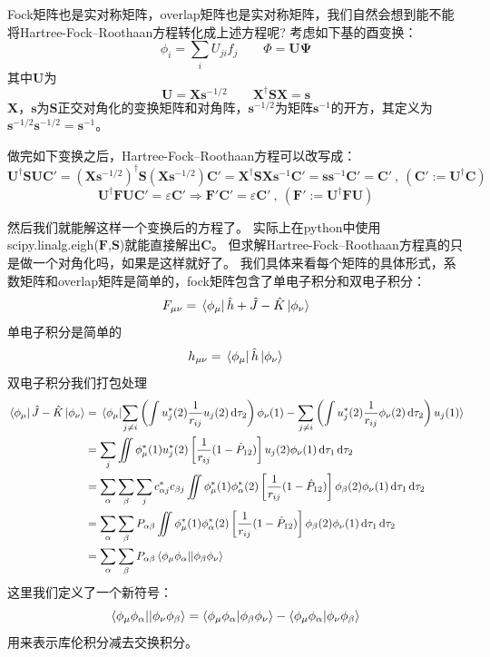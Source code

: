 Fock矩阵也是实对称矩阵，overlap矩阵也是实对称矩阵，我们自然会想到能不能将Hartree-Fock–Roothaan方程转化成上述方程呢?
考虑如下基的酉变换：
\[\phi_i = \sum_{i}U_{ji}f_j \qquad \mathbf{\varPhi}=\mathbf{U}\mathbf{\Psi}\]
其中$\mathbf{U}$为
\[\mathbf{U}=\mathbf{X}\mathbf{s}^{-1/2} \qquad \mathbf{X}^{\dagger}\mathbf{S}\mathbf{X}=\mathbf{s}\]
$\mathbf{X}$，$\mathbf{s}$为$\mathbf{S}$正交对角化的变换矩阵和对角阵，$\mathbf{s}^{-1/2}$为矩阵$\mathbf{s}^{-1}$的开方，其定义为$\mathbf{s}^{-1/2}\mathbf{s}^{-1/2}=\mathbf{s}^{-1}$。

做完如下变换之后，Hartree-Fock–Roothaan方程可以改写成：
\[\mathbf{U}^{\dagger}\mathbf{S}\mathbf{U}\mathbf{C}'=(\mathbf{X}\mathbf{s}^{-1/2})^{\dagger}\mathbf{S}(\mathbf{X}\mathbf{s}^{-1/2})\mathbf{C}'=\mathbf{X}^{\dagger}\mathbf{S}\mathbf{X}\mathbf{s}^{-1}\mathbf{C}'=\mathbf{s}\mathbf{s}^{-1}\mathbf{C}'=\mathbf{C}' \ , \ (\mathbf{C}':=\mathbf{U}^{\dagger}\mathbf{C})\]
\[\mathbf{U}^{\dagger}\mathbf{F}\mathbf{U}\mathbf{C}'=\varepsilon\mathbf{C}' \Rightarrow \mathbf{F}'\mathbf{C}'=\varepsilon\mathbf{C}' \ , \ (\mathbf{F}':=\mathbf{U}^{\dagger}\mathbf{F}\mathbf{U})\]

然后我们就能解这样一个变换后的方程了。
实际上在python中使用scipy.linalg.eigh($\mathbf{F}$,$\mathbf{S}$)就能直接解出$\mathbf{C}$。
但求解Hartree-Fock–Roothaan方程真的只是做一个对角化吗，如果是这样就好了。
我们具体来看每个矩阵的具体形式，系数矩阵和overlap矩阵是简单的，fock矩阵包含了单电子积分和双电子积分：
\[F_{\mu\nu} = \bra*{\phi_{\mu}}\hat{h} + \hat{J} - \hat{K}\ket*{\phi_{\nu}}\]
单电子积分是简单的
\[h_{\mu\nu}=\bra*{\phi_{\mu}}\hat{h}\ket*{\phi_{\nu}}\]
双电子积分我们打包处理
\begin{equation*}
    \begin{aligned}
        \bra*{\phi_{\mu}}\hat{J} - \hat{K}\ket*{\phi_{\nu}} & = \bra*{\phi_{\mu}}\ket{\sum_{j \neq i}\left(\int u_j^*(2)\frac{1}{r_{ij}}u_j(2)\dd{\tau_2}\right)\phi_{\nu}(1)-\sum_{j \neq i}\left(\int u_j^*(2)\frac{1}{r_{ij}}\phi_{\nu}(2)\dd{\tau_2}\right)u_j(1)} \\
         & = \sum_{j}\iint \phi_{\mu}^*(1)u_j^*(2)\left[\frac{1}{r_{ij}}(1-\hat{P}_{12})\right]u_j(2)\phi_{\nu}(1) \dd{\tau_1}\dd{\tau_2} \\
         & = \sum_{\alpha}\sum_{\beta}\sum_{j}c^*_{\alpha j}c_{\beta j}\iint \phi_{\mu}^*(1)\phi_{\alpha}^*(2)\left[\frac{1}{r_{ij}}(1-\hat{P}_{12})\right]\phi_{\beta}(2)\phi_{\nu}(1) \dd{\tau_1}\dd{\tau_2} \\
         & = \sum_{\alpha}\sum_{\beta}P_{\alpha\beta}\iint \phi_{\mu}^*(1)\phi_{\alpha}^*(2)\left[\frac{1}{r_{ij}}(1-\hat{P}_{12})\right]\phi_{\beta}(2)\phi_{\nu}(1) \dd{\tau_1}\dd{\tau_2} \\
         & = \sum_{\alpha}\sum_{\beta}P_{\alpha\beta}\bra{\phi_{\mu}\phi_{\alpha}}\ket{|\phi_{\beta}\phi_{\nu}}
    \end{aligned}
\end{equation*}
这里我们定义了一个新符号：
\[\bra{\phi_{\mu}\phi_{\alpha}}\ket{|\phi_{\nu}\phi_{\beta}}=\bra{\phi_{\mu}\phi_{\alpha}}\ket{\phi_{\beta}\phi_{\nu}}-\bra{\phi_{\mu}\phi_{\alpha}}\ket{\phi_{\nu}\phi_{\beta}}\]
用来表示库伦积分减去交换积分。

